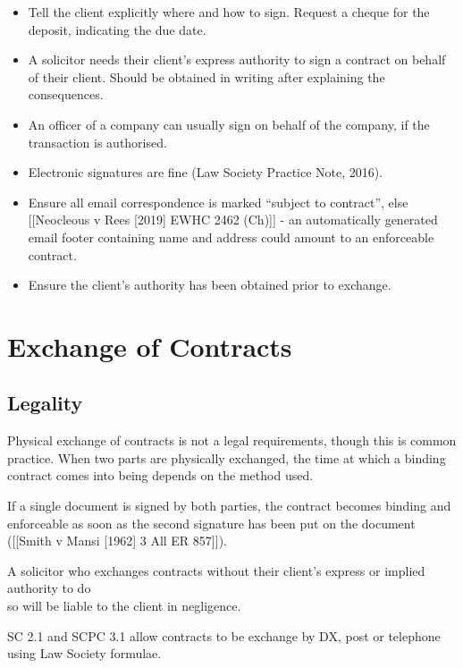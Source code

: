 \documentclass[
]{article}
\providecommand{\tightlist}{%
  \setlength{\itemsep}{0pt}\setlength{\parskip}{0pt}}
\begin{document}
\begin{itemize}
\tightlist
\item
  Tell the client explicitly where and how to sign. Request a cheque for
  the deposit, indicating the due date.
\item
  A solicitor needs their client's express authority to sign a contract
  on behalf of their client. Should be obtained in writing after
  explaining the consequences.
\item
  An officer of a company can usually sign on behalf of the company, if
  the transaction is authorised.
\item
  Electronic signatures are fine (Law Society Practice Note, 2016).
\item
  Ensure all email correspondence is marked ``subject to contract'',
  else {[}{[}Neocleous v Rees {[}2019{]} EWHC 2462 (Ch){]}{]} - an
  automatically generated email footer containing name and address could
  amount to an enforceable contract.
\item
  Ensure the client's authority has been obtained prior to exchange.
\end{itemize}

\hypertarget{exchange-of-contracts}{%
\section{Exchange of Contracts}\label{exchange-of-contracts}}

\hypertarget{legality}{%
\subsection{Legality}\label{legality}}

Physical exchange of contracts is not a legal requirements, though this
is common practice. When two parts are physically exchanged, the time at
which a binding contract comes into being depends on the method used.

If a single document is signed by both parties, the contract becomes
binding and enforceable as soon as the second signature has been put on
the document ({[}{[}Smith v Mansi {[}1962{]} 3 All ER 857{]}{]}).

A solicitor who exchanges contracts without their client's express or
implied authority to do\\
so will be liable to the client in negligence.

SC 2.1 and SCPC 3.1 allow contracts to be exchange by DX, post or
telephone using Law Society formulae.
\end{document}
